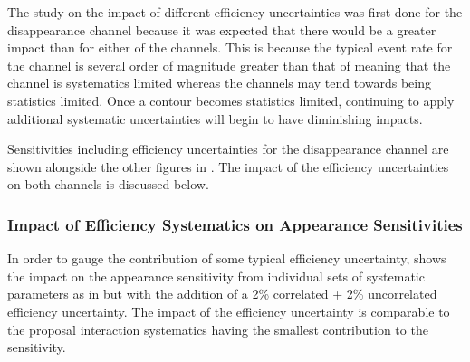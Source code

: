 The study on the impact of different efficiency uncertainties was first done for the \numu disappearance channel because it was expected that there would be a greater impact than for either of the \nue channels. This is because the typical event rate for the \numu channel is several order of magnitude greater than that of \nue meaning that the \numu channel is systematics limited whereas the \nue channels may tend towards being statistics limited. Once a contour becomes statistics limited, continuing to apply additional systematic uncertainties will begin to have diminishing impacts. 

Sensitivities including efficiency uncertainties for the \numu disappearance channel are shown alongside the other figures in . The impact of the efficiency uncertainties on both \nue channels is discussed below.


\subsubsection*{\texorpdfstring{Impact of Efficiency Systematics on \nue Appearance Sensitivities}{Impact of Efficiency Systematics on nue Appearance Sensitivities}}

In order to gauge the contribution of some typical efficiency uncertainty,  shows the impact on the \nue appearance sensitivity from individual sets of systematic parameters as in  but with the addition of a 2\% correlated + 2\% uncorrelated efficiency uncertainty. The impact of the efficiency uncertainty is comparable to the proposal interaction systematics having the smallest contribution to the sensitivity. 


